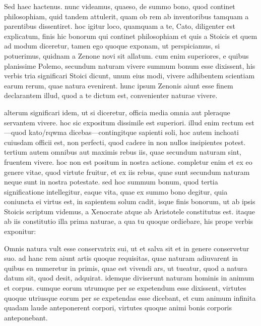  Sed haec hactenus. nunc videamus, quaeso, de summo bono, quod continet philosophiam, quid tandem attulerit, quam ob rem ab inventoribus tamquam a parentibus dissentiret. hoc igitur loco, quamquam a te, Cato, diligenter est explicatum, finis hic bonorum qui continet philosophiam et quis a Stoicis et quem ad modum diceretur, tamen ego quoque exponam, ut perspiciamus, si potuerimus, quidnam a Zenone novi sit allatum. cum enim superiores, e quibus planissime Polemo, secundum naturam vivere summum bonum esse dixissent, his verbis tria significari Stoici dicunt, unum eius modi, vivere adhibentem scientiam earum rerum, quae natura evenirent. hunc ipsum Zenonis aiunt esse finem declarantem illud, quod a te dictum est, convenienter naturae vivere.

 alterum significari idem, ut si diceretur, officia media omnia aut pleraque servantem vivere. hoc sic expositum dissimile est superiori. illud enim rectum est—quod kato/rqwma dicebas—contingitque sapienti soli, hoc autem inchoati cuiusdam officii est, non perfecti, quod cadere in non nullos insipientes potest. tertium autem omnibus aut maximis rebus iis, quae secundum naturam sint, fruentem vivere. hoc non est positum in nostra actione. completur enim et ex eo genere vitae, quod virtute fruitur, et ex iis rebus, quae sunt secundum naturam neque sunt in nostra potestate. sed hoc summum bonum, quod tertia significatione intellegitur, eaque vita, quae ex summo bono degitur, quia coniuncta ei virtus est, in sapientem solum cadit, isque finis bonorum, ut ab ipsis Stoicis scriptum videmus, a Xenocrate atque ab Aristotele constitutus est. itaque ab iis constitutio illa prima naturae, a qua tu quoque ordiebare, his prope verbis exponitur:

 Omnis natura vult esse conservatrix sui, ut et salva sit et in genere conservetur suo. ad hanc rem aiunt artis quoque requisitas, quae naturam adiuvarent in quibus ea numeretur in primis, quae est vivendi ars, ut tueatur, quod a natura datum sit, quod desit, adquirat. idemque diviserunt naturam hominis in animum et corpus. cumque eorum utrumque per se expetendum esse dixissent, virtutes quoque utriusque eorum per se expetendas esse dicebant, et cum animum infinita quadam laude anteponerent corpori, virtutes quoque animi bonis corporis anteponebant.

